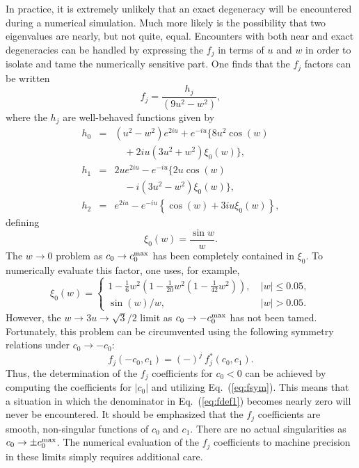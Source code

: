 In practice, it is extremely unlikely that an exact degeneracy will be
encountered during a numerical simulation.  Much more likely is the
possibility that two eigenvalues are nearly, but not quite, equal.
Encounters with both near and exact degeneracies can be handled
by expressing the $f_j$ in terms of $u$
and $w$ in order to isolate and tame the numerically sensitive part.
One finds that the $f_j$ factors can be written
\begin{equation}
   f_j = \frac{h_j}{(9u^2-w^2)},
\label{eq:fdef1}
\end{equation}
where the $h_j$ are well-behaved functions given by
\begin{eqnarray}                                           
  h_0 &=& (u^2\!-\!w^2)e^{2i u}+e^{-i u}\bigl\{ 8u^2\cos( w)\nonumber\\
  &&\quad + 2iu(3u^2\!+\!w^2)\xi_0( w)\bigr\}, \\
  h_1 &=& 2ue^{2i u}-e^{-i u}\bigl\{ 2u\cos( w) \nonumber\\
  &&\quad - i(3u^2\!-\!w^2)\xi_0( w)\bigr\}, \\
  h_2 &=& e^{2i u}-e^{-i u}\left\{ \cos( w)
  + 3iu\xi_0( w)\right\},
\label{eq:hdef}
\end{eqnarray}
defining
\begin{equation}
 \xi_0(w) = \frac{\sin w}{w}.
\end{equation}
The $w\rightarrow 0$ problem as $c_0\rightarrow c_0^{\rm max}$
has been completely contained in $\xi_0$.  To numerically evaluate 
this factor, one uses, for example,
\[
 \xi_0(w) = \left\{ \begin{array}{ll}
  1\!-\!\frac{1}{6}w^2\left(1\!-\!\frac{1}{20}w^2
  \left(1\!-\!\frac{1}{42}w^2\right)\right) ,
 & \  \vert w\vert\leq 0.05,\\[2mm]
  \sin(w)/w, & \ \vert w\vert>0.05.
 \end{array}\right.
\]
However, the $w\rightarrow 3u\rightarrow \sqrt{3}/2$ limit as
$c_0\rightarrow -c_0^{\rm max}$ has not been tamed.
Fortunately, this problem can be circumvented using the following
symmetry relations under $c_0\rightarrow -c_0$:
\begin{equation}
   f_j(-c_0,c_1)=(-)^j\ f_j^\ast(c_0,c_1). \label{eq:fsym}
\end{equation}
Thus, the determination of the $f_j$ coefficients for $c_0<0$ can
be achieved by computing the coefficients for $\vert c_0\vert$
and utilizing Eq.~(\ref{eq:fsym}).  This means that a
situation in which the denominator in Eq.~(\ref{eq:fdef1})
becomes nearly zero will never be encountered.  It should be
emphasized that the $f_j$ coefficients are smooth, non-singular
functions of $c_0$ and $c_1$.  There are no actual singularities
as $c_0\rightarrow\pm c_0^{\rm max}$.  The numerical evaluation
of the $f_j$ coefficients to machine precision in these limits
simply requires additional care.

